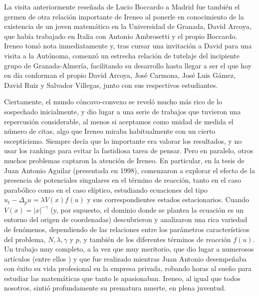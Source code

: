 La visita anteriormente rese\~nada de Lucio Boccardo a Madrid  fue tambi\'en el germen de otra relaci\'on importante de Ireneo al ponerle en conocimiento de la existencia de un joven matem\'atico en la Universidad de Granada, David Arcoya, que hab\'ia trabajado en Italia con Antonio Ambrosetti y el propio Boccardo. Ireneo tom\'o nota inmediatamente y, tras cursar una invitaci\'on a David para una visita a la Aut\'onoma, comenz\'o un estrecha relaci\'on de tutelaje del incipiente grupo de Granada-Almer\'ia, facilitando su desarrollo hasta llegar a ser el que  hoy en d\'ia conforman el propio David Arcoya, Jos\'e Carmona, Jos\'e Luis G\'amez, David Ruiz  y Salvador Villegas, junto con sus respectivos estudiantes.



Ciertamente, el mundo c\'oncavo-convexo se revel\'o mucho m\'as rico de lo sospechado inicialmente, y dio lugar a una serie de trabajos que tuvieron una repercusi\'on considerable, al menos si aceptamos como unidad de medida el n\'umero de citas, algo que Ireneo miraba habitualmente con un cierto escepticismo. Siempre dec\'ia que lo importante era valorar los resultados, y no usar los rankings para evitar la fastidiosa tarea de pensar. Pero en paralelo, otros muchos problemas captaron la atenci\'on de Ireneo. En particular, en la tesis de Juan Antonio Aguilar (presentada en 1998), comenzaron a explorar el efecto de la presencia de potenciales singulares en el t\'ermino de reacci\'on, tanto en el caso parab\'olico como en el caso el\'iptico, estudiando ecuaciones del tipo $ u_t - \Delta_p u = \lambda V(x) f(u) $ y sus correspondientes estados estacionarios. Cuando $V(x)=|x|^{-\gamma} $ (y, por supuesto, el dominio donde se plantea la ecuaci\'on es un entorno del origen de coordenadas) descubrieron y analizaron una rica variedad de fen\'omenos, dependiendo de las relaciones entre los par\'ametros caracter\'isticos del problema, $ N, \lambda, \gamma$ y $ p $, y tambi\'en de los diferentes t\'erminos de reacci\'on $ f(u)$. Un trabajo muy completo, a la vez que muy meritorio, que dio lugar a numerosos art\'iculos {(entre ellos \cite{Aguilar-Peral_5})} y que fue realizado mientras Juan Antonio  desempe\~naba con \'exito su vida profesional en la empresa privada, robando horas al sue\~no para estudiar las matem\'aticas que tanto le apasionaban. Ireneo, al igual que todos nosotros,  sinti\'o  profundamente su prematura muerte, en plena juventud.


